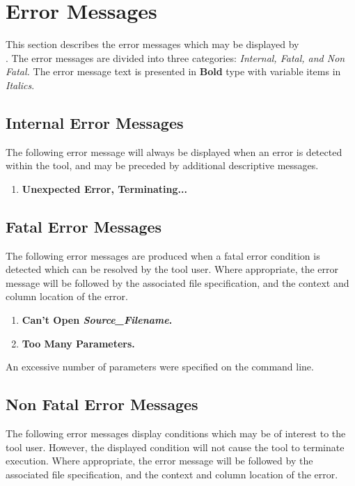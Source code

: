 \section{Error Messages}
This section describes the error messages which may be displayed by\\
\ayacc.  The error messages are divided into three categories:
{\it Internal, Fatal, and Non Fatal.}
The error message text is presented in {\bf Bold} type with
variable items in {\it Italics}.
\newpage
\subsection{Internal Error Messages}
The following error message will always be displayed
when an error is detected within the tool, and may be preceded by additional
descriptive messages.

\begin{enumerate}
\item {\bf Unexpected Error, Terminating...}
\end{enumerate}
\subsection{Fatal Error Messages}
The following error messages are produced when a fatal error condition is
detected which can be resolved by the tool user.  Where appropriate, the error
message will be followed by the associated file specification, and the context
and column
location of the error.
\begin{enumerate}
\item {\bf Can't Open {\it Source\_Filename}.}
\item {\bf Too Many Parameters.}
\end{enumerate}
An excessive number of parameters were specified on the command line.
\subsection{Non Fatal Error Messages}
The following error messages display conditions which may be of interest to
the tool user.  However, the displayed condition will not cause the tool to
terminate execution.  Where appropriate, the error
message will be followed by the associated file specification, and the context
and column
location of the error.

